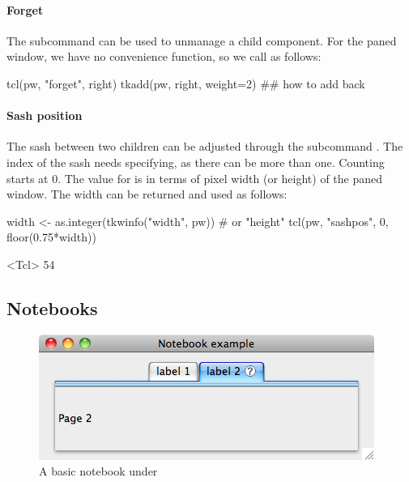 \paragraph{Forget}
The subcommand  can be used to
unmanage a child component. For the paned window, we have no
convenience function, so we call as follows:
\begin{Schunk}
\begin{Sinput}
 tcl(pw, "forget", right)
 tkadd(pw, right, weight=2) ## how to add back
\end{Sinput}
\end{Schunk}
%
\paragraph{Sash position}
The sash between two children can be adjusted through the subcommand
. The index of the sash needs
specifying, as there can be more than one. Counting starts at 0. The
value for  is in terms of pixel width (or height) of the
paned window. The width can be returned and used as follows:
\begin{Schunk}
\begin{Sinput}
 width <- as.integer(tkwinfo("width", pw))  # or "height"
 tcl(pw, "sashpos", 0, floor(0.75*width))
\end{Sinput}
\begin{Soutput}
<Tcl> 54 
\end{Soutput}
\end{Schunk}
%

\subsection{Notebooks}
\label{sec:tcltk:notebooks}


%
\begin{figure}
  \centering
  \includegraphics[width=.6\textwidth]{fig-tcltk-notebook}
 \caption{A basic notebook under \OSX{}}
  \label{fig:fig-notebook-example}
\end{figure}

